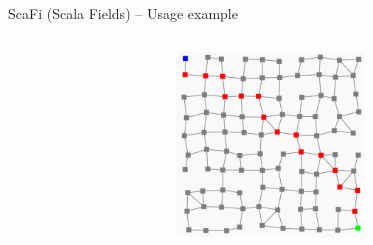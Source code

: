 \documentclass[presentation, 9pt]{beamer}\mode<presentation>{\usetheme{AMSBolognaFC}}
\begin{document}
\begin{frame}{ScaFi (Scala Fields) -- Usage example}
\begin{columns}
\begin{column}[c]{0.4\textwidth}
	\end{column}
	\begin{column}[c]{0.4\textwidth}
		\includegraphics[width=5cm]{img/channel.png}
	\end{column}
\end{columns}
\end{frame}
\end{document}
